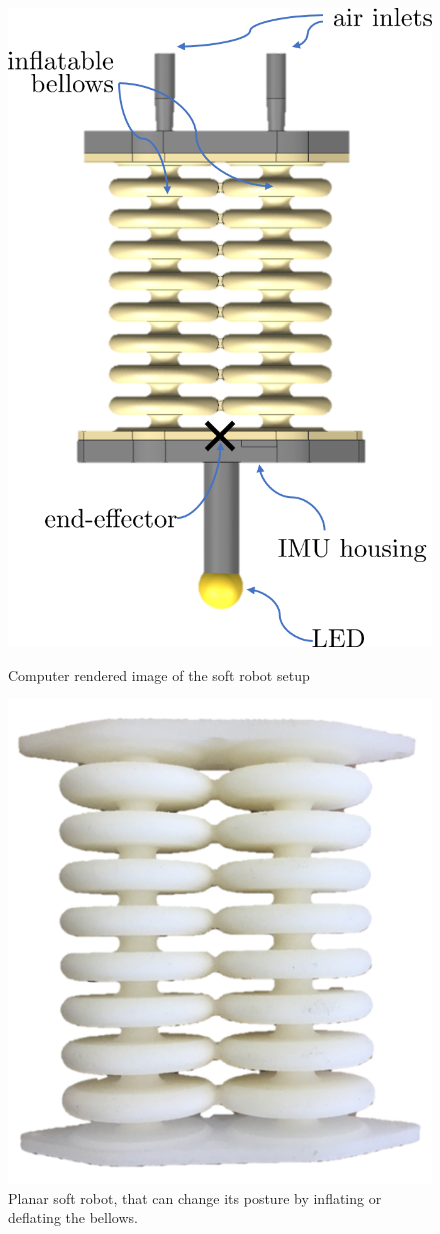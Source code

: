 \begin{figure}[H]
\begin{minipage}{.5\textwidth}
  \centering
  \includegraphics[width = 0.6\linewidth]{Figures/Chapter1/completesetup2.png}
  \caption{Computer rendered image of the soft robot setup }
  \label{fig:test1}
\end{minipage}
\hspace{10pt}
\begin{minipage}{.5\textwidth}
  \centering
  \includegraphics[width =0.6\linewidth]{Figures/Chapter1/actuator.png}
  \vspace{60pt}
  \caption{Planar soft robot, that can change its posture by inflating or deflating the bellows.}
  \label{fig:test2}
\end{minipage}
\end{figure}



